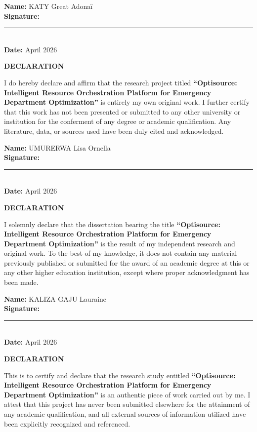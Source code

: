 \documentclass[12pt, a4paper]{article}
\begin{document}
\noindent \textbf{Name:} KATY Great Adonaï\\[1cm]
\noindent \textbf{Signature:} \rule{6cm}{0.4pt}\\[1cm]
\noindent \textbf{Date:} April 2026
\newpage

\vspace*{2cm}
\begin{center}
    \Large\bfseries\color{primary} DECLARATION
\end{center}
\vspace{1.5cm}
I do hereby declare and affirm that the research project titled \textbf{``Optisource: Intelligent Resource Orchestration Platform for Emergency Department Optimization''} is entirely my own original work. I further certify that this work has not been presented or submitted to any other university or institution for the conferment of any degree or academic qualification. Any literature, data, or sources used have been duly cited and acknowledged.
\vspace{2cm}

\noindent \textbf{Name:} UMURERWA Lisa Ornella\\[1cm]
\noindent \textbf{Signature:} \rule{6cm}{0.4pt}\\[1cm]
\noindent \textbf{Date:} April 2026
\newpage

\vspace*{2cm}
\begin{center}
    \Large\bfseries\color{primary} DECLARATION
\end{center}
\vspace{1.5cm}
I solemnly declare that the dissertation bearing the title \textbf{``Optisource: Intelligent Resource Orchestration Platform for Emergency Department Optimization''} is the result of my independent research and original work. To the best of my knowledge, it does not contain any material previously published or submitted for the award of an academic degree at this or any other higher education institution, except where proper acknowledgment has been made.
\vspace{2cm}

\noindent \textbf{Name:} KALIZA GAJU Lauraine\\[1cm]
\noindent \textbf{Signature:} \rule{6cm}{0.4pt}\\[1cm]
\noindent \textbf{Date:} April 2026
\newpage

\vspace*{2cm}
\begin{center}
    \Large\bfseries\color{primary} DECLARATION
\end{center}
\vspace{1.5cm}
This is to certify and declare that the research study entitled \textbf{``Optisource: Intelligent Resource Orchestration Platform for Emergency Department Optimization''} is an authentic piece of work carried out by me. I attest that this project has never been submitted elsewhere for the attainment of any academic qualification, and all external sources of information utilized have been explicitly recognized and referenced.
\vspace{2cm}
\end{document}
